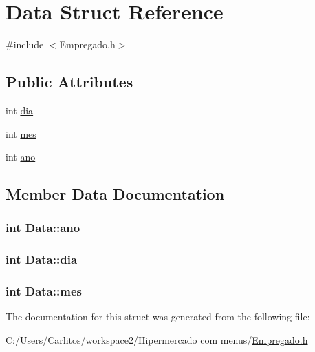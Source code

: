 \hypertarget{struct_data}{
\section{Data Struct Reference}
\label{struct_data}
}


{\ttfamily \#include $<$Empregado.h$>$}

\subsection*{Public Attributes}
\begin{DoxyCompactItemize}
\item 
int \hyperlink{struct_data_ad76270db677fc394a4a7ded1c58de6d5}{dia}
\item 
int \hyperlink{struct_data_a8f77c5b515144e08b4fe26a8604f30ad}{mes}
\item 
int \hyperlink{struct_data_a80d76fe2225d187fe8a20414478a2cb5}{ano}
\end{DoxyCompactItemize}


\subsection{Member Data Documentation}
\hypertarget{struct_data_a80d76fe2225d187fe8a20414478a2cb5}{
\subsubsection[{ano}]{\setlength{\rightskip}{0pt plus 5cm}int {\bf Data::ano}}}
\label{struct_data_a80d76fe2225d187fe8a20414478a2cb5}
\hypertarget{struct_data_ad76270db677fc394a4a7ded1c58de6d5}{
\subsubsection[{dia}]{\setlength{\rightskip}{0pt plus 5cm}int {\bf Data::dia}}}
\label{struct_data_ad76270db677fc394a4a7ded1c58de6d5}
\hypertarget{struct_data_a8f77c5b515144e08b4fe26a8604f30ad}{
\subsubsection[{mes}]{\setlength{\rightskip}{0pt plus 5cm}int {\bf Data::mes}}}
\label{struct_data_a8f77c5b515144e08b4fe26a8604f30ad}


The documentation for this struct was generated from the following file:\begin{DoxyCompactItemize}
\item 
C:/Users/Carlitos/workspace2/Hipermercado com menus/\hyperlink{_empregado_8h}{Empregado.h}\end{DoxyCompactItemize}

